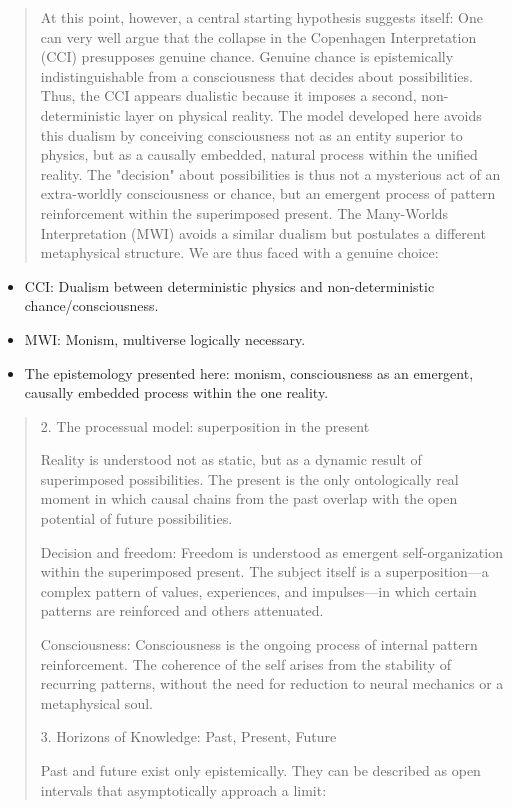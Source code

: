 \documentclass[
  ngerman,
]{article}
\begin{document}
\begin{quote}
At this point, however, a central starting hypothesis suggests itself:
One can very well argue that the collapse in the Copenhagen
Interpretation (CCI) presupposes genuine chance. Genuine chance is
epistemically indistinguishable from a consciousness that decides about
possibilities. Thus, the CCI appears dualistic because it imposes a
second, non-deterministic layer on physical reality. The model developed
here avoids this dualism by conceiving consciousness not as an entity
superior to physics, but as a causally embedded, natural process within
the unified reality. The "decision" about possibilities is thus not a
mysterious act of an extra-worldly consciousness or chance, but an
emergent process of pattern reinforcement within the superimposed
present. The Many-Worlds Interpretation (MWI) avoids a similar dualism
but postulates a different metaphysical structure. We are thus faced
with a genuine choice:
\end{quote}

\begin{itemize}
\item
  CCI: Dualism between deterministic physics and non-deterministic
  chance/consciousness.
\item
  MWI: Monism, multiverse logically necessary.
\item
  The epistemology presented here: monism, consciousness as an emergent,
  causally embedded process within the one reality.
\end{itemize}

\begin{quote}
2. The processual model: superposition in the present

Reality is understood not as static, but as a dynamic result of
superimposed possibilities. The present is the only ontologically real
moment in which causal chains from the past overlap with the open
potential of future possibilities.

Decision and freedom: Freedom is understood as emergent
self-organization within the superimposed present. The subject itself is
a superposition---a complex pattern of values, experiences, and
impulses---in which certain patterns are reinforced and others
attenuated.

Consciousness: Consciousness is the ongoing process of internal pattern
reinforcement. The coherence of the self arises from the stability of
recurring patterns, without the need for reduction to neural mechanics
or a metaphysical soul.

3. Horizons of Knowledge: Past, Present, Future

Past and future exist only epistemically. They can be described as open
intervals that asymptotically approach a limit:
\end{quote}
\end{document}
